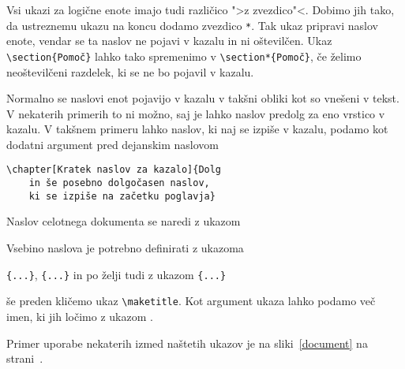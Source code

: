Vsi ukazi za logične enote imajo tudi različico ">z zvezdico"<. Dobimo jih tako, da 
ustreznemu ukazu na koncu dodamo zvezdico \verb|*|. Tak ukaz pripravi naslov enote, vendar se 
ta naslov ne pojavi v kazalu in ni oštevilčen. Ukaz \verb|\section{Pomoč}|  lahko tako spremenimo
v \verb|\section*{Pomoč}|, če želimo neoštevilčeni razdelek, ki se ne bo pojavil v kazalu.

Normalno se naslovi enot pojavijo v kazalu v takšni obliki kot so vnešeni v tekst.
V nekaterih primerih to ni možno, saj je lahko naslov predolg za eno vrstico v kazalu. V takšnem primeru
lahko naslov, ki naj se izpiše v kazalu, podamo kot dodatni argument pred dejanskim naslovom

\begin{code}
\verb|\chapter[Kratek naslov za kazalo]{Dolg|\\
\verb|    in še posebno dolgočasen naslov,|\\
\verb|    ki se izpiše na začetku poglavja}|
\end{code} 

Naslov celotnega dokumenta se naredi z ukazom 
\begin{lscommand}
\end{lscommand}
\noindent Vsebino naslova je potrebno definirati z ukazoma
\begin{lscommand}
\verb|{...}|, \verb|{...}| 
in po želji tudi z ukazom \verb|{...}| 
\end{lscommand}
\noindent še preden kličemo ukaz \verb|\maketitle|. Kot argument ukaza  lahko podamo več
imen, ki jih ločimo z ukazom . 

Primer uporabe nekaterih izmed naštetih ukazov je na sliki~\ref{document} na strani~\pageref{document}.

